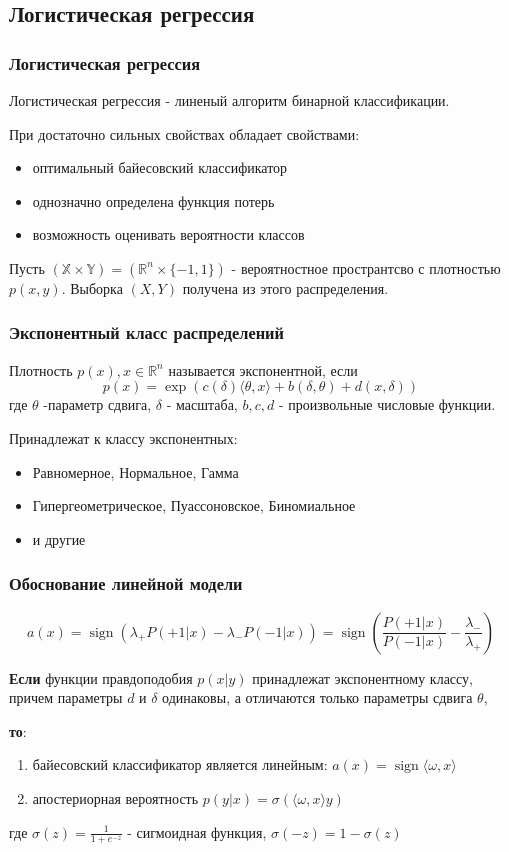 \documentclass{beamer}
\DeclareMathOperator{\sign}{sign}
\begin{document}
	\subsection{Логистическая регрессия}
	
	\begin{frame}
		\frametitle{Логистическая регрессия}
		Логистическая регрессия - линеный алгоритм бинарной классификации.
		
		При достаточно сильных свойствах обладает свойствами:
		\begin{itemize}
			\item оптимальный байесовский классификатор
			\item однозначно определена функция потерь
			\item возможность оценивать вероятности классов
		\end{itemize}
		
		Пусть $(\mathbb{X}\times \mathbb{Y}) = (\mathbb{R}^{n} \times \{-1, 1\})$ - вероятностное пространтсво с плотностью $p(x, y)$. Выборка $(X, Y)$ получена из этого распределения.
	\end{frame}
	
	\begin{frame}
		\frametitle{Экспонентный класс распределений}
		Плотность $p(x), x \in \mathbb{R}^{n}$ называется экспонентной, если
		\[
			p(x) = \exp(c(\delta) \langle \theta, x \rangle + b(\delta, \theta) + d(x, \delta))
		\]
		 где $\theta$ -параметр сдвига, $\delta$ - масштаба, $b, c, d$ - произвольные числовые функции.
		 
		 \vspace{15pt}
		 
		 Принадлежат к классу экспонентных:
		 \begin{itemize}
		 	\item Равномерное, Нормальное, Гамма
		 	\item Гипергеометрическое, Пуассоновское, Биномиальное
		 	\item и другие
		 \end{itemize}
	\end{frame}
	
	\begin{frame}
		\frametitle{Обоснование линейной модели}
		\[a(x) = \sign(\lambda_+ P(+1 | x) - \lambda_- P(-1 | x)) =
		\sign(\frac{P(+1 | x)}{P(-1 | x)} - \frac{\lambda_-}{\lambda_+})
		\]
		
		\textbf{Если} функции правдоподобия $p(x | y) $ принадлежат экспонентному классу, причем параметры $d$ и $\delta$ одинаковы, а отличаются только параметры сдвига $\theta$, 
		
		\textbf{то}:
		\begin{enumerate}
			\item байесовский классификатор является линейным: $a(x) = \sign \langle \omega, x \rangle$
			\item апостериорная вероятность $p(y | x) = \sigma(\langle \omega, x \rangle y)$
		\end{enumerate}
		
		где $\sigma(z) = \frac{1}{1 + e^{-z}}$ - сигмоидная функция, $\sigma(-z) = 1 - \sigma(z)$
	\end{frame}
	
\end{document}

